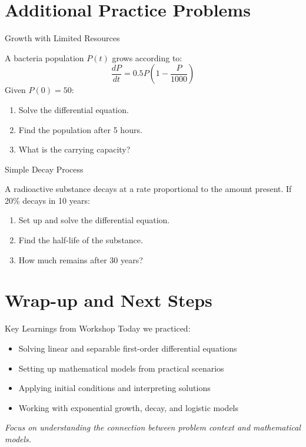 \documentclass[10pt,aspectratio=169]{beamer}
\newcommand{\formula}[1]{\textit{#1}}
\newcommand{\emphasis}[1]{\textit{#1}}
\begin{document}
\section{Additional Practice Problems}
\begin{frame}{Growth with Limited Resources}
    \begin{problembox}
        A bacteria population $P(t)$ grows according to:
        \formula{\[ \frac{dP}{dt} = 0.5P\left(1-\frac{P}{1000}\right) \]}
        Given $P(0) = 50$:
        \begin{enumerate}
            \item Solve the differential equation.
            \item Find the population after 5 hours.
            \item What is the carrying capacity?
        \end{enumerate}
    \end{problembox}
\end{frame}

\begin{frame}{Simple Decay Process}
    \begin{problembox}
        A radioactive substance decays at a rate proportional to the amount present. If 20\% decays in 10 years:
        \begin{enumerate}
            \item Set up and solve the differential equation.
            \item Find the half-life of the substance.
            \item How much remains after 30 years?
        \end{enumerate}
    \end{problembox}
\end{frame}

\section{Wrap-up and Next Steps}
\begin{frame}{Key Learnings from Workshop}
    Today we practiced:
    \begin{itemize}
        \item Solving linear and separable first-order differential equations
        \item Setting up mathematical models from practical scenarios
        \item Applying initial conditions and interpreting solutions
        \item Working with exponential growth, decay, and logistic models
    \end{itemize}
    \emphasis{Focus on understanding the connection between problem context and mathematical models.}
\end{frame}
\end{document}
